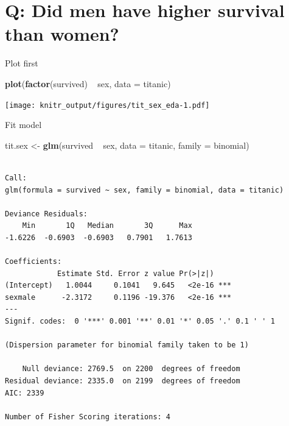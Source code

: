 \documentclass[10pt,ignorenonframetext,]{beamer}
\newenvironment{Shaded}{\begin{snugshade}}{\end{snugshade}}
\newcommand{\KeywordTok}[1]{\textcolor[rgb]{0.13,0.29,0.53}{\textbf{{#1}}}}
\newcommand{\DataTypeTok}[1]{\textcolor[rgb]{0.13,0.29,0.53}{{#1}}}
\newcommand{\StringTok}[1]{\textcolor[rgb]{0.31,0.60,0.02}{{#1}}}
\newcommand{\NormalTok}[1]{{#1}}
\begin{document}
\section{Q: Did men have higher survival than
women?}\label{q-did-men-have-higher-survival-than-women}

\begin{frame}[fragile]{Plot first}

\begin{Shaded}
\begin{Highlighting}[]
\KeywordTok{plot}\NormalTok{(}\KeywordTok{factor}\NormalTok{(survived) ~}\StringTok{ }\NormalTok{sex, }\DataTypeTok{data =} \NormalTok{titanic)}
\end{Highlighting}
\end{Shaded}

\texttt{[image: knitr\_output/figures/tit\_sex\_eda-1.pdf]}

\end{frame}

\begin{frame}[fragile]{Fit model}

\begin{Shaded}
\begin{Highlighting}[]
\NormalTok{tit.sex <-}\StringTok{ }\KeywordTok{glm}\NormalTok{(survived ~}\StringTok{ }\NormalTok{sex, }\DataTypeTok{data =} \NormalTok{titanic, }\DataTypeTok{family =} \NormalTok{binomial)}
\end{Highlighting}
\end{Shaded}

\begin{verbatim}

Call:
glm(formula = survived ~ sex, family = binomial, data = titanic)

Deviance Residuals: 
    Min       1Q   Median       3Q      Max  
-1.6226  -0.6903  -0.6903   0.7901   1.7613  

Coefficients:
            Estimate Std. Error z value Pr(>|z|)    
(Intercept)   1.0044     0.1041   9.645   <2e-16 ***
sexmale      -2.3172     0.1196 -19.376   <2e-16 ***
---
Signif. codes:  0 '***' 0.001 '**' 0.01 '*' 0.05 '.' 0.1 ' ' 1

(Dispersion parameter for binomial family taken to be 1)

    Null deviance: 2769.5  on 2200  degrees of freedom
Residual deviance: 2335.0  on 2199  degrees of freedom
AIC: 2339

Number of Fisher Scoring iterations: 4
\end{verbatim}

\end{frame}
\end{document}
